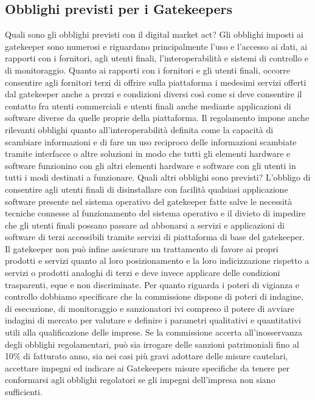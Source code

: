 \subsection{Obblighi previsti per i Gatekeepers}
Quali sono gli obblighi previsti con il digital market act?
Gli obblighi imposti ai gatekeeper sono numerosi e riguardano principalmente l'uso e l'accesso ai dati, ai rapporti con i fornitori, agli utenti finali, l'interoperabilità e sistemi di controllo e di monitoraggio.
Quanto ai rapporti con i fornitori e gli utenti finali, occorre consentire agli fornitori terzi di offrire sulla piattaforma i medesimi servizi offerti dal gatekeeper anche a prezzi e condizioni diversi così come si deve consentire il contatto fra utenti commerciali e utenti finali anche mediante applicazioni di software diverse da quelle proprie della piattaforma.
Il regolamento impone anche rilevanti obblighi quanto all'interoperabilità definita come la capacità di scambiare informazioni e di fare un uso reciproco delle informazioni scambiate tramite interfacce o altre soluzioni in modo che tutti gli elementi hardware e software funzionino con gli altri elementi hardware e software con gli utenti in tutti i modi destinati a funzionare.
Quali altri obblighi sono previsti?
L'obbligo di consentire agli utenti finali di disinstallare con facilità qualsiasi applicazione software presente nel sistema operativo del gatekeeper fatte salve le necessità tecniche connesse al funzionamento del sistema operativo e il divieto di impedire che gli utenti finali possano passare ad abbonarsi a servizi e applicazioni di software di terzi accessibili tramite servizi di piattaforma di base del gatekeeper.
Il gatekeeper non può infine assicurare un trattamento di favore ai propri prodotti e servizi quanto al loro posizionamento e la loro indicizzazione rispetto a servizi o prodotti analoghi di terzi e deve invece applicare delle condizioni trasparenti, eque e non discriminate.
Per quanto riguarda i poteri di vigianza e controllo dobbiamo specificare che la commissione dispone di poteri di indagine, di esecuzione, di monitoraggio e sanzionatori ivi compreso il potere di avviare indagini di mercato per valutare e definire i parametri qualitativi e quantitativi utili alla qualificazione delle imprese.
Se la commissione accerta all'inosservanza degli obblighi regolamentari, può sia irrogare delle sanzioni patrimoniali fino al 10\% di fatturato anno, sia nei casi più gravi adottare delle misure cautelari, accettare impegni ed indicare ai Gatekeepers  misure specifiche da tenere per conformarsi agli obblighi regolatori se gli impegni dell'impresa non siano sufficienti.
